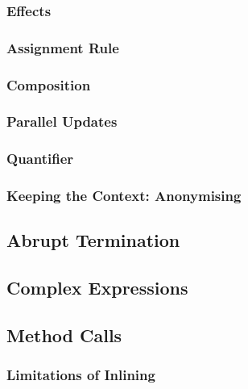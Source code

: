 \documentclass[a4paper, 11pt, accentcolor = tud3b]{tudreport}
\begin{document}
				\subsubsection{Effects} %

				\subsubsection{Assignment Rule} %

				\subsubsection{Composition} %

				\subsubsection{Parallel Updates} %

				\subsubsection{Quantifier} %

				\subsubsection{Keeping the Context: Anonymising} %

			\subsection{Abrupt Termination} %

			\subsection{Complex Expressions} %

			\subsection{Method Calls} %

				\subsubsection{Limitations of Inlining} %
\end{document}
